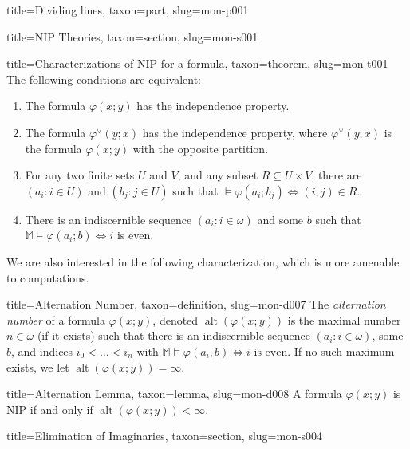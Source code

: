 \documentclass[a4paper]{article}
\begin{document}
\begin{tree}{title={Dividing lines}, taxon={part}, slug={mon-p001}}
\begin{tree}{title={NIP Theories}, taxon={section}, slug={mon-s001}}
\begin{tree}{title={Characterizations of NIP for a formula}, taxon={theorem}, slug={mon-t001}}
The following conditions are equivalent:
\begin{enumerate}
\item{ The formula \(\varphi (x;y)\) has the independence property.}
  \item{ The formula \(\varphi ^{ \vee }(y;x)\) has the independence property,
	where \(\varphi ^{ \vee }(y;x)\) is the formula \(\varphi (x;y)\) with the
	opposite partition.}
	\item{ For any two finite sets \(U\) and \(V\), and any subset \(R  \subseteq  U  \times  V\), there are \((a_i : i  \in  U)\) and \((b_j : j  \in  U)\) such that \(\mathbb   \models   \varphi (a_i;b_j)  \Longleftrightarrow  (i,j)  \in  R\).}
	\item{ There is an indiscernible sequence \((a_i : i  \in   \omega )\)
	and some \(b\) such that \(\mathbb  M  \models   \varphi (a_i;b)  \Longleftrightarrow  i\)
	is even.}
\end{enumerate}\par{We are also interested in the following characterization, which is more amenable to computations.}
\begin{tree}{title={Alternation Number}, taxon={definition}, slug={mon-d007}}
The \emph{alternation number} of a formula \(\varphi (x;y)\), denoted \(\operatorname {alt}( \varphi (x;y))\) is the maximal number \(n  \in   \omega\) (if it exists) such that there is an indiscernible sequence \((a_i : i  \in   \omega )\), some \(b\), and indices \(i_0 <  \dots  < i_n\) with \(\mathbb  M  \models   \varphi (a_i,b)  \Longleftrightarrow  i  \text { is even}\). If no such maximum exists, we let \(\operatorname {alt}( \varphi (x;y)) =  \infty\).
\end{tree}

\begin{tree}{title={Alternation Lemma}, taxon={lemma}, slug={mon-d008}}
A formula \(\varphi (x;y)\) is NIP if and only if \(\operatorname {alt}( \varphi (x;y)) <  \infty\).
\end{tree}

\end{tree}

\end{tree}


    
    
\begin{tree}{title={Elimination of Imaginaries}, taxon={section}, slug={mon-s004}}


\end{tree}
\end{tree}
\end{document}
